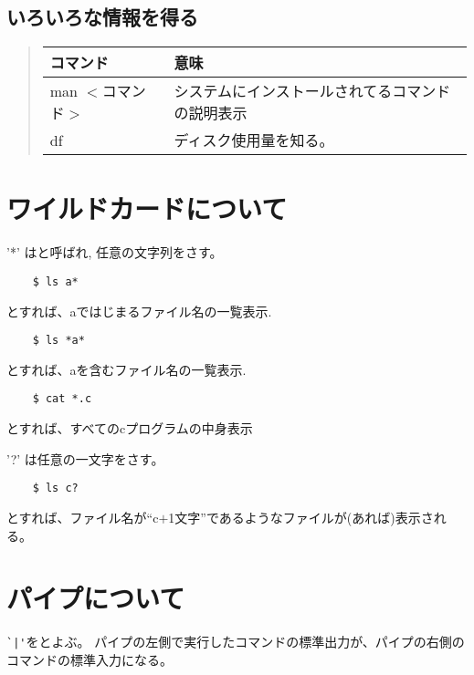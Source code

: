 \documentclass{jreport}
\begin{document}
\subsection{いろいろな情報を得る}

\begin{quote}
\begin{tabular}[t]{ll}\hline
コマンド & 意味 \\ \hline
man $<$コマンド$>$ & システムにインストールされてるコマンドの説明表示 \\
df & ディスク使用量を知る。 \\
\hline
\end{tabular}
\end{quote}



\section{ワイルドカードについて}
'*' はと呼ばれ, 任意の文字列をさす。
\begin{screen}
\begin{verbatim}
    $ ls a*
\end{verbatim}
\end{screen}
とすれば、aではじまるファイル名の一覧表示.
\begin{screen}
\begin{verbatim}
    $ ls *a*
\end{verbatim}
\end{screen}
とすれば、aを含むファイル名の一覧表示.
\begin{screen}
\begin{verbatim}
    $ cat *.c
\end{verbatim}
\end{screen}
とすれば、すべてのcプログラムの中身表示

'?' は任意の一文字をさす。
\begin{screen}
\begin{verbatim}
    $ ls c?
\end{verbatim}
\end{screen}
とすれば、ファイル名が``c$+$1文字''であるようなファイルが(あれば)表示される。


\section{パイプについて}
\verb-`|'-をとよぶ。
パイプの左側で実行したコマンドの標準出力が、パイプの右側のコマンドの標準入力になる。
\end{document}
